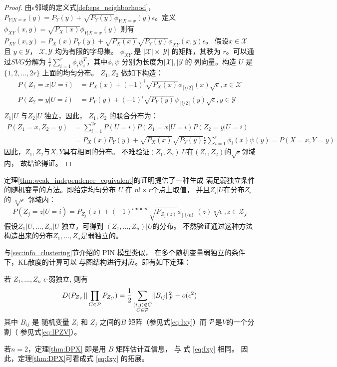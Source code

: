 \begin{proof}
  由$\epsilon$邻域的定义式\ref{def:eps_neighborhood}，
  $P_{Y|X=x}(y) = P_Y(y) + \sqrt{P_Y(y)}\phi_{Y|X=x}(y)
  \epsilon$。定义$\phi_{XY}(x,y)=\sqrt{P_X(x)}\phi_{Y|X=x}(y)$
  则有
  $P_{XY}(x,y) = P_X(x)P_Y(y) + \sqrt{P_X(x)}\sqrt{P_Y(y)}\phi_{XY}(x,y)
  \epsilon$。
  假设$x\in \mathcal{X}$ 且 $y\in \mathcal{Y}$，
  $\mathcal{X}, \mathcal{Y}$ 均为有限的字母集。
  $\phi_{XY}$ 是 $|\mathcal{X}| \times |\mathcal{Y}|$
  的矩阵，其秩为 $r$。可以通过$SVG$分解为
  $\frac{1}{r}\sum_{i=1}^r \phi_i \psi^T_i$，其中$\phi, \psi$
  分别为长度为$|\mathcal{X}|, |\mathcal{Y}|$的
  列向量。构造 $U$ 是$\{1, 2, \dots, 2r\}$ 上面的均匀分布。
  $Z_1, Z_2$ 做如下构造：
  \begin{align*}
    P(Z_1=x|U=i) &= P_X(x) + (-1)^i\sqrt{P_X(x)}\phi_{\lceil i/2 \rceil}(x) \sqrt{\epsilon}, x \in \mathcal{X} \\
    P(Z_2=y|U=i) &= P_Y(y) + (-1)^i\sqrt{P_Y(y)}\psi_{\lceil i/2 \rceil}(y) \sqrt{\epsilon}, y \in \mathcal{Y}\\
  \end{align*}
  $Z_1 | U$ 与$Z_2 | U$ 独立，因此，
  $Z_1, Z_2$ 的联合分布为：
  \begin{align*}
  P(Z_1=x, Z_2=y)& =\sum_{i=1}^{2r}P(U=i)P(Z_1=x|U=i)P(Z_2=y|U=i)\\
  &=P_X(x)P_Y(y) + \sqrt{P_X(x)}\sqrt{P_Y(y)}\frac{\epsilon}{r}
  \sum_{i=1}^{r}\phi_i(x)
  \psi(y) =P(X=x,Y=y)
  \end{align*}
  因此，$Z_1, Z_2$与$X,Y$具有相同的分布。
  不难验证$(Z_1, Z_2)|U$在$(Z_1, Z_2)$的$\sqrt{\epsilon}$邻域内，
  故结论得证。
  \end{proof}
  定理\ref{thm:weak_independence_equivalent}的证明提供了一种生成
  满足弱独立条件的随机变量的方法。即给定均匀分布
  $U$ 在 $n! \times r$个点上取值，
  并且$Z_i|U$在分布$Z_i$的
  $\sqrt[n]{\epsilon}$ 邻域内：
  \begin{equation}
    P(Z_j=z|U=i) = P_{Z_j}(z) + 
    (-1)^{i \,\mathrm{mod}\, n!}\sqrt{P_{Z_j(z)}}
    \phi_{\lceil\, i/n!\, \rceil}(z) \sqrt[n]{\epsilon}, z \in \mathcal{Z_j}
  \end{equation}
  假设$Z_1|U, \dots, Z_n|U$ 独立，可得到
  $(Z_1, \dots, Z_n)|U$的分布。
  不然验证通过这种方法构造出来的分布$Z_1, \dots, Z_n$是弱独立的。

与\ref{sec:info_clustering}节介绍的 PIN 模型类似，
在多个随机变量弱独立的条件下，KL散度的计算可以
与图结构进行对应。即有如下定理：
\begin{theorem}\label{thm:DPX}
若 $Z_1, \dots, Z_n$ $\epsilon$-弱独立, 则有
\begin{equation}\label{eq:PXV}
D(P_{Z_V} || \prod_{C\in \P} P_{Z_{C}}) = {1 \over 2}
\sum_{\substack{(i,j) \not\in C\\ C\in \P}} \norm{B_{ij}}_F^2 + o(\epsilon^2)
\end{equation}
其中 $B_{ij}$ 是 随机变量  $Z_i$ 和 $Z_j$
之间的$B$ 矩阵（参见式\ref{eq:Ixy}）而 $\P$是$V$的一个分割（
参见式\ref{eq:IPZV}）。 
\end{theorem}
若$ n = 2$，定理\ref{thm:DPX} 即是用 $B$ 矩阵估计互信息，
与 式 \eqref{eq:Ixy} 相同。
因此，定理\ref{thm:DPX}可看成式 \eqref{eq:Ixy} 
的拓展。


